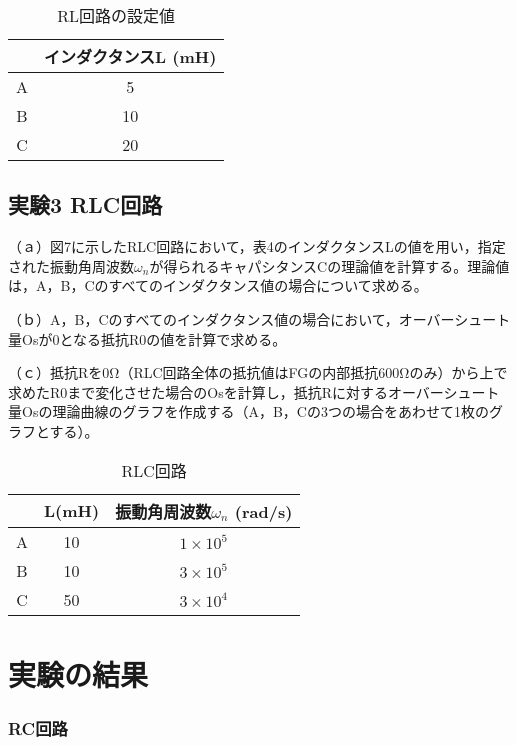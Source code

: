 \documentclass[a4paper,11pt,xelatex,ja=standard]{bxjsarticle}
\begin{document}
    \begin{table}[htbp]
    \centering
    \caption{RL回路の設定値}
    \begin{tabular}{|c|c|}
    \hline
    & インダクタンスL (mH) \\
    \hline
    A & 5 \\
    B & 10 \\
    C & 20 \\
    \hline
    \end{tabular}
    \end{table}
    
    \subsection{実験3 RLC回路}
    （ａ）図7に示したRLC回路において，表4のインダクタンスLの値を用い，指定された振動角周波数\(\omega_n\)が得られるキャパシタンスCの理論値を計算する。理論値は，A，B，Cのすべてのインダクタンス値の場合について求める。
    
    （ｂ）A，B，Cのすべてのインダクタンス値の場合において，オーバーシュート量Osが0となる抵抗R0の値を計算で求める。
    
    （ｃ）抵抗Rを0Ω（RLC回路全体の抵抗値はFGの内部抵抗600Ωのみ）から上で求めたR0まで変化させた場合のOsを計算し，抵抗Rに対するオーバーシュート量Osの理論曲線のグラフを作成する（A，B，Cの3つの場合をあわせて1枚のグラフとする）。
    
    \begin{table}[htbp]
    \centering
    \caption{RLC回路}
    \begin{tabular}{|c|c|c|}
    \hline
    & L(mH) & 振動角周波数\(\omega_n\) (rad/s) \\
    \hline
    A & 10 & \(1 \times 10^5\) \\
    B & 10 & \(3 \times 10^5\) \\
    C & 50 & \(3 \times 10^4\) \\
    \hline
    \end{tabular}
    \end{table}
    \section{実験の結果}
        \subsubsection{RC回路}
        
\end{document}
